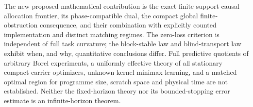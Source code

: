 The new proposed mathematical contribution is the exact finite-support causal allocation frontier, its phase-compatible dual, the compact global finite-obstruction consequence, and their combination with explicitly counted implementation and distinct matching regimes. The zero-loss criterion is independent of full task curvature; the block-stable law and blind-transport law exhibit when, and why, quantitative conclusions differ. Full predictive quotients of arbitrary Borel experiments, a uniformly effective theory of all stationary compact-carrier optimizers, unknown-kernel minimax learning, and a matched optimal region for programme size, scratch space and physical time are not established. Neither the fixed-horizon theory nor its bounded-stopping error estimate is an infinite-horizon theorem.
